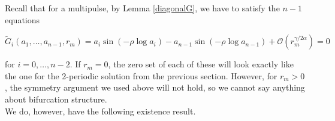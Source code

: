 \documentclass[12pt]{article}
\begin{document}
Recall that for a multipulse, by Lemma \ref{diagonalG}, we have to satisfy the $n-1$ equations

\begin{equation}
\tilde{G}_i(a_1, \dots, a_{n-1}, r_m) = a_i \sin \left( - \rho \log a_i \right) - a_{n-1} \sin \left( -\rho \log a_{n-1} \right) + \mathcal{O}(r_m^{\gamma / 2 \alpha}) = 0
\end{equation}

for $i = 0, \dots, n-2$. If $r_m = 0$, the zero set of each of these will look exactly like the one for the 2-periodic solution from the previous section. However, for $r_m > 0$, the symmetry argument we used above will not hold, so we cannot say anything about bifurcation structure.\\

We do, however, have the following existence result.
\end{document}

